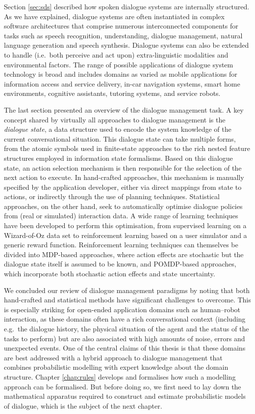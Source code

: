 Section \ref{sec:sds} described how spoken dialogue systems are internally structured. As we have explained, dialogue systems are often instantiated in complex software architectures that comprise numerous interconnected components for tasks such as speech recognition, understanding, dialogue management, natural language generation and speech synthesis.  Dialogue systems can also be extended to handle (i.e.\ both perceive and act upon) extra-linguistic modalities and environmental factors. The range of possible applications of dialogue system technology is broad and includes domains as varied as mobile applications for information access and service delivery, in-car navigation systems, smart home environments, cognitive assistants, tutoring systems, and service robots. 

The last section presented an overview of the dialogue management task. A key concept shared by virtually all approaches to dialogue management is the \textit{dialogue state}, a data structure used to encode the system knowledge of the current conversational situation.  This dialogue state can take multiple forms, from the atomic symbols used in finite-state approaches to the rich nested feature structures employed in information state formalisms. Based on this dialogue state, an action selection mechanism is then responsible for the selection of the next action to execute.  In hand-crafted approaches, this mechanism is manually specified by the application developer, either via direct mappings from state to actions, or indirectly through the use of planning techniques.  Statistical approaches, on the other hand, seek to automatically optimise dialogue policies from (real or simulated) interaction data.  A wide range of learning techniques have been developed to perform this optimisation, from supervised learning on a Wizard-of-Oz data set to reinforcement learning based on a user simulator and a generic reward function.   Reinforcement learning techniques can themselves be divided into MDP-based approaches, where action effects are stochastic but the dialogue state itself is assumed to be known, and POMDP-based approaches, which incorporate both stochastic action effects and state uncertainty.

We concluded our review of dialogue management paradigms by noting that both hand-crafted and statistical methods have significant challenges to overcome.  This is especially striking for open-ended application domains such as human--robot interaction, as these domains often have a rich conversational context (including e.g.\ the dialogue history, the physical situation of the agent and the status of the tasks to perform) but are also associated with high amounts of noise, errors and unexpected events. One of the central claims of this thesis is that these domains are best addressed with a hybrid approach to dialogue management that combines probabilistic modelling with expert knowledge about the domain structure.  Chapter \ref{chap:rules} develops and formalises how such a modelling approach can be formalised.  But before doing so, we first need to lay down the mathematical apparatus required to construct and estimate probabilistic models of dialogue, which is the subject of the next chapter.

